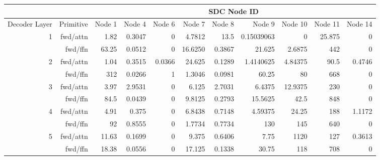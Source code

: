 \begin{table*}[t]


\begin{center}
\begin{tiny}
\begin{sc}

\begin{tabular}{rrrrrrrrrrr}
\toprule
 &  & \multicolumn{9}{c}{SDC Node ID}                                                \\
\midrule
Decoder Layer        & Primitive            & Node 1     & Node 4      & Node 6      & Node 7       & Node 8       & Node 9          & Node 10      & Node 11     & Node 14     \\
\midrule
\multirow{2}{*}{1}                    & fwd/attn             & 1.82  & 0.3047 & 0      & 4.7812  & 13.5    & 0.15039063 & 0       & 25.875 & 0      \\
                     & fwd/ffn              & 63.25 & 0.0512 & 0      & 16.6250 & 0.3867  & 21.625     & 2.6875  & 442    & 0      \\
\midrule
\multirow{2}{*}{2}                     & fwd/attn             & 1.04  & 0.3515 & 0.0366 & 24.625  & 0.1289  & 1.4140625  & 4.84375 & 90.5   & 0.4746 \\
                     & fwd/ffn              & 312   & 0.0266 & 1      & 1.3046  & 0.0981  & 60.25      & 80      & 668    & 0      \\
\midrule
\multirow{2}{*}{3}                   & fwd/attn             & 3.97  & 2.9531 & 0      & 6.125   & 2.7031  & 6.4375     & 12.9375 & 230    & 0      \\
                     & fwd/ffn              & 84.5  & 0.0439 & 0      & 9.8125  & 0.2793  & 15.5625    & 42.5    & 848    & 0      \\
\midrule
\multirow{2}{*}{4}                    & fwd/attn             & 4.91  & 0.375  & 0      & 6.8438  & 0.7148  & 4.59375    & 24.25   & 188    & 1.1172 \\
                     & fwd/ffn              & 92    & 0.8555 & 0      & 1.7734  & 0.7734  & 130        & 145     & 640    & 0      \\
\midrule
\multirow{2}{*}{5}                  & fwd/attn             & 11.63 & 0.1699 & 0      & 9.375   & 0.6406  & 7.75       & 1120    & 127    & 0.3613 \\
                     & fwd/ffn              & 18.38 & 0.0556 & 0      & 17.125  & 0.1338  & 30.75      & 118     & 708    & 0      \\

\end{tabular}
\end{sc}
\end{tiny}
\end{center}
\end{table*}

